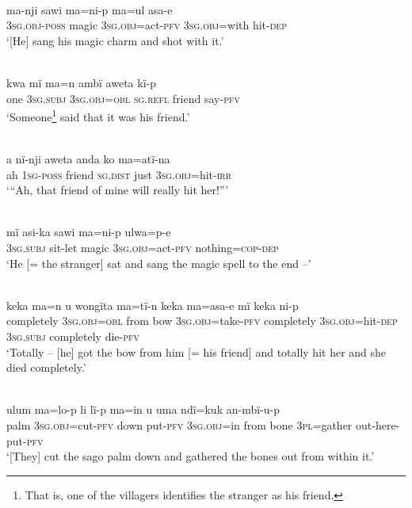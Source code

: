 \\
\gll ma-nji      sawi  ma=ni-p      ma=ul      asa-e\\
\textsc{3sg.obj-poss}  magic  3\textsc{sg.obj}=act-\textsc{pfv}  3\textsc{sg.obj}=with  hit-\textsc{dep}\\
\glt ‘[He] sang his magic charm and shot with it.’

\\
\gll kwa  mï      ma=n      ambï    aweta  kï-p\\
one    3\textsc{sg.subj}  3\textsc{sg.obj=obl}  \textsc{sg.refl}  friend  say-\textsc{pfv}\\
\glt ‘Someone\footnote{That is, one of the villagers identifies the stranger as his friend.} said that it was his friend.’

\\
\gll a  nï-nji    aweta  anda    ko  ma=atï-na\\
ah  1\textsc{sg-poss}  friend  \textsc{sg.dist}  just  3\textsc{sg.obj=}hit-\textsc{irr}\\
\glt ‘“Ah, that friend of mine will really hit her!”’

\\
\gll mï      asi-ka  sawi  ma=ni-p      ulwa=p-e\\
3\textsc{sg.subj}  sit-let  magic  3\textsc{sg.obj}=act-\textsc{pfv}  nothing=\textsc{cop}{}-\textsc{dep}\\
\glt ‘He [= the stranger] sat and sang the magic spell to the end --’

\\
\gll keka      ma=n      u    wongïta  ma=tï-n keka      ma=asa-e      mï       keka      ni-p\\
completely  3\textsc{sg.obj=obl}  from  bow    3\textsc{sg.obj}=take-\textsc{pfv} completely  3\textsc{sg.obj}=hit-\textsc{dep}  3\textsc{sg.subj}  completely  die-\textsc{pfv}\\
\glt ‘Totally -- [he] got the bow from him [= his friend] and totally hit her and she died completely.’

\\
\gll ulum  ma=lo-p      li    lï-p      ma=in      u    uma ndï=kuk    an-mbï-u-p\\
palm  3\textsc{sg.obj}=cut-\textsc{pfv}  down  put-\textsc{pfv}  \textsc{3sg.obj=}in  from  bone 3\textsc{pl}=gather  out-here-put-\textsc{pfv}\\
\glt ‘[They] cut the sago palm down and gathered the bones out from within it.’

